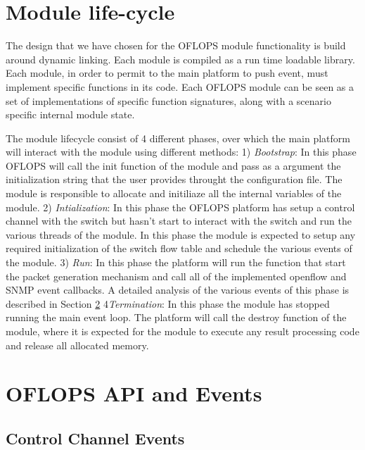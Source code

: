 \documentclass{book}
\begin{document}
\section{Module life-cycle}

The design that we have chosen for the OFLOPS module functionality is build around dynamic linking. Each module
is compiled as a run time loadable library. Each module, in order to permit to the main platform to push event,
must implement specific functions in its code. Each OFLOPS module can be seen as a set of implementations of 
specific function signatures, along with a scenario specific internal module state. 

The module lifecycle consist of 4 different phases, over which the main platform will interact with the module 
using different methods:
1) \textit{Bootstrap}: In this phase OFLOPS will call the init function of the module and pass as a argument
the initialization string that the user provides throught the configuration file. The module is responsible to 
allocate and initiliaze all the internal variables of the module. 
2) \textit{Intialization}: In this phase the OFLOPS platform has setup a control channel with the switch but hasn't 
start to interact with the switch and run the various threads of the module. In this phase the module is expected 
to setup any required initialization of the switch flow table and schedule the various events of the module. 
3) \textit{Run}: In this phase the platform will run the function that start the packet generation mechanism and 
call all of the implemented openflow and SNMP event callbacks. A detailed analysis of the various events of this phase
is described in Section \ref{OFLOPS_API}
4\textit{Termination}: In this phase the module has stopped running the main event loop. The platform will call the 
destroy function of the module, where it is expected for the module to execute any result processing code and release 
all allocated memory. 

\section{OFLOPS API and Events}
\label{OFLOPS_API}

\subsection{Control Channel Events}
\end{document}
